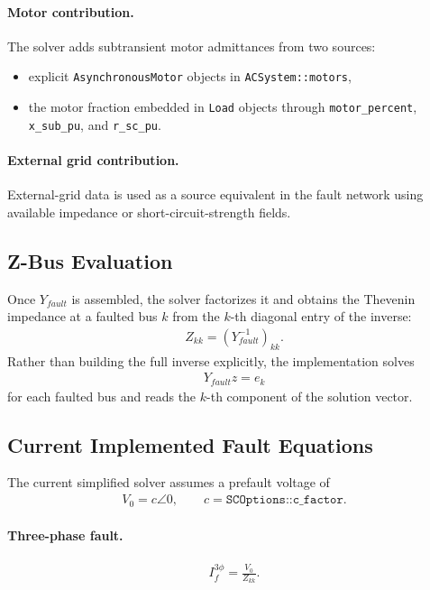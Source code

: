 \paragraph{Motor contribution.}
The solver adds subtransient motor admittances from two sources:
\begin{itemize}
  \item explicit \texttt{AsynchronousMotor} objects in \texttt{ACSystem::motors},
  \item the motor fraction embedded in \texttt{Load} objects through \texttt{motor\_percent}, \texttt{x\_sub\_pu}, and \texttt{r\_sc\_pu}.
\end{itemize}

\paragraph{External grid contribution.}
External-grid data is used as a source equivalent in the fault network using
available impedance or short-circuit-strength fields.

\subsection{Z-Bus Evaluation}

Once \(Y_{fault}\) is assembled, the solver factorizes it and obtains the
Thevenin impedance at a faulted bus \(k\) from the \(k\)-th diagonal entry of the
inverse:
\begin{align}
Z_{kk} = \left(Y_{fault}^{-1}\right)_{kk}.
\end{align}
Rather than building the full inverse explicitly, the implementation solves
\begin{align}
Y_{fault} z = e_k
\end{align}
for each faulted bus and reads the \(k\)-th component of the solution vector.

\subsection{Current Implemented Fault Equations}

The current simplified solver assumes a prefault voltage of
\begin{align}
V_0 = c\angle 0, \qquad c = \texttt{SCOptions::c\_factor}.
\end{align}

\paragraph{Three-phase fault.}
\begin{align}
I_f^{3\phi} = \frac{V_0}{Z_{kk}}.
\end{align}


